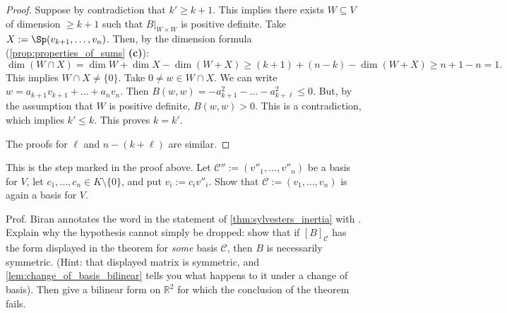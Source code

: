 \begin{proof}
Suppose by contradiction that $k' \ge k+1$. This implies there exists $W \subseteq V$ of dimension $\ge k+1$ such that $B|_{W \times W}$ is positive definite. Take $X := \Sp(v_{k+1}, \dots, v_n)$.
Then, by the dimension formula (\cref{prop:properties_of_sums} \textbf{(c)}):
\[
\dim(W \cap X) = \dim W + \dim X - \dim(W+X) \ge (k+1) + (n-k) - \dim(W+X) \ge n+1 - n = 1.
\]
This implies $W \cap X \neq \{0\}$.
Take $0 \neq w \in W \cap X$. We can write $w = a_{k+1} v_{k+1} + \dots + a_n v_n$.
Then $B(w, w) = -a_{k+1}^2 - \dots - a_{k+\ell}^2 \le 0$. But, by the assumption that $W$ is positive definite, $B(w, w) > 0$. This is a contradiction, which implies $k' \le k$.
This proves $k = k'$.

The proofs for $\ell$ and $n - (k + \ell)$ are similar.
\end{proof}

\begin{exercise}
\label{exc:scaled_family_is_basis}
This is the step marked  in the proof above. Let $\mathcal{C}'' := (v''_1, \dots, v''_n)$ be a basis for $V$, let $c_1, \dots, c_n \in K \setminus \{0\}$, and put $v_i := c_i v''_i$. Show that $\mathcal{C} := (v_1, \dots, v_n)$ is again a basis for $V$.
\end{exercise}

\begin{exercise}
\label{exc:sylvester_needs_symmetry}
Prof. Biran annotates the word  in the statement of \cref{thm:sylvesters_inertia} with . Explain why the hypothesis cannot simply be dropped: show that if $[B]_{\mathcal{C}}$ has the form displayed in the theorem for \emph{some} basis $\mathcal{C}$, then $B$ is necessarily symmetric. (Hint: that displayed matrix is symmetric, and \cref{lem:change_of_basis_bilinear} tells you what happens to it under a change of basis). Then give a bilinear form on $\mathbb{R}^2$ for which the conclusion of the theorem fails.
\end{exercise}

